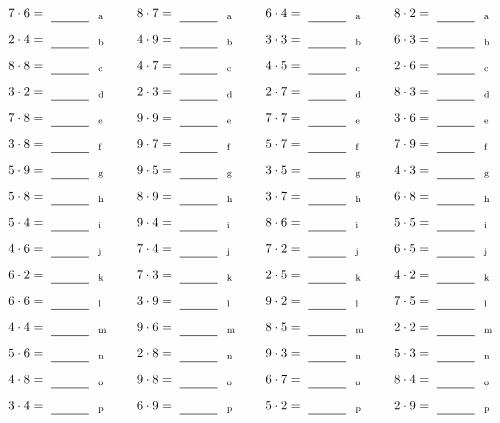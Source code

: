 \documentclass
[
  draft    = true,
  fontsize = 11pt,
  parskip  = half-
]
{scrartcl}
\begin{document}
\par\vfill\par
\begin{align*}
    \pline{7\cdot6}&=\rline{a}
  & \pline{8\cdot7}&=\rline{a}
  & \pline{6\cdot4}&=\rline{a}
  & \pline{8\cdot2}&=\rline{a} \\[1ex]
    \pline{2\cdot4}&=\rline{b}
  & \pline{4\cdot9}&=\rline{b}
  & \pline{3\cdot3}&=\rline{b}
  & \pline{6\cdot3}&=\rline{b} \\[1ex]
    \pline{8\cdot8}&=\rline{c}
  & \pline{4\cdot7}&=\rline{c}
  & \pline{4\cdot5}&=\rline{c}
  & \pline{2\cdot6}&=\rline{c} \\[1ex]
    \pline{3\cdot2}&=\rline{d}
  & \pline{2\cdot3}&=\rline{d}
  & \pline{2\cdot7}&=\rline{d}
  & \pline{8\cdot3}&=\rline{d} \\[1ex]
    \pline{7\cdot8}&=\rline{e}
  & \pline{9\cdot9}&=\rline{e}
  & \pline{7\cdot7}&=\rline{e}
  & \pline{3\cdot6}&=\rline{e} \\[1ex]
    \pline{3\cdot8}&=\rline{f}
  & \pline{9\cdot7}&=\rline{f}
  & \pline{5\cdot7}&=\rline{f}
  & \pline{7\cdot9}&=\rline{f} \\[1ex]
    \pline{5\cdot9}&=\rline{g}
  & \pline{9\cdot5}&=\rline{g}
  & \pline{3\cdot5}&=\rline{g}
  & \pline{4\cdot3}&=\rline{g} \\[1ex]
    \pline{5\cdot8}&=\rline{h}
  & \pline{8\cdot9}&=\rline{h}
  & \pline{3\cdot7}&=\rline{h}
  & \pline{6\cdot8}&=\rline{h} \\[1ex]
    \pline{5\cdot4}&=\rline{i}
  & \pline{9\cdot4}&=\rline{i}
  & \pline{8\cdot6}&=\rline{i}
  & \pline{5\cdot5}&=\rline{i} \\[1ex]
    \pline{4\cdot6}&=\rline{j}
  & \pline{7\cdot4}&=\rline{j}
  & \pline{7\cdot2}&=\rline{j}
  & \pline{6\cdot5}&=\rline{j} \\[1ex]
    \pline{6\cdot2}&=\rline{k}
  & \pline{7\cdot3}&=\rline{k}
  & \pline{2\cdot5}&=\rline{k}
  & \pline{4\cdot2}&=\rline{k} \\[1ex]
    \pline{6\cdot6}&=\rline{l}
  & \pline{3\cdot9}&=\rline{l}
  & \pline{9\cdot2}&=\rline{l}
  & \pline{7\cdot5}&=\rline{l} \\[1ex]
    \pline{4\cdot4}&=\rline{m}
  & \pline{9\cdot6}&=\rline{m}
  & \pline{8\cdot5}&=\rline{m}
  & \pline{2\cdot2}&=\rline{m} \\[1ex]
    \pline{5\cdot6}&=\rline{n}
  & \pline{2\cdot8}&=\rline{n}
  & \pline{9\cdot3}&=\rline{n}
  & \pline{5\cdot3}&=\rline{n} \\[1ex]
    \pline{4\cdot8}&=\rline{o}
  & \pline{9\cdot8}&=\rline{o}
  & \pline{6\cdot7}&=\rline{o}
  & \pline{8\cdot4}&=\rline{o} \\[1ex]
    \pline{3\cdot4}&=\rline{p}
  & \pline{6\cdot9}&=\rline{p}
  & \pline{5\cdot2}&=\rline{p}
  & \pline{2\cdot9}&=\rline{p}
\end{align*}
\end{document}
